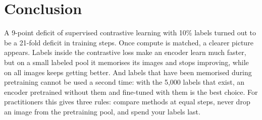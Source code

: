 \section{Conclusion}
\label{sec:conclusion}

A 9-point deficit of supervised contrastive learning with 10\% labels turned out to be a 21-fold deficit in
training steps. Once compute is matched, a clearer picture appears. Labels inside the contrastive loss make an
encoder learn much faster, but on a small labeled pool it memorises its images and stops improving, while
\simclr on all images keeps getting better. And labels that have been memorised during pretraining cannot be
used a second time: with the 5,000 labels that exist, an encoder pretrained without them and fine-tuned with them
is the best choice. For practitioners this gives three rules: compare methods at equal steps, never drop an
image from the pretraining pool, and spend your labels last.





